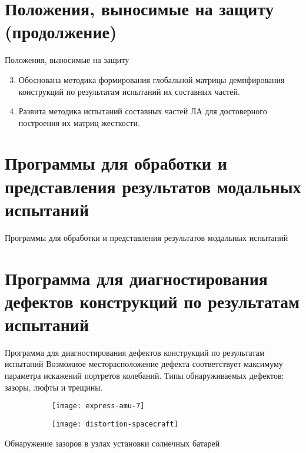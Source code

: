 \section{Положения, выносимые на защиту (продолжение)}

\begin{frame}{Положения, выносимые на защиту}
	\begin{enumerate}
		\setcounter{enumi}{2} 
		\item Обоснована методика формирования глобальной матрицы демпфирования конструкций по результатам испытаний их составных частей.
		\item Развита методика испытаний составных частей ЛА для достоверного построения их матриц жесткости.
	\end{enumerate}
\end{frame}

\section{Программы для обработки и представления результатов модальных испытаний}

\begin{frame}{Программы для обработки и представления результатов модальных испытаний}
	\begin{center}
	\end{center}
\end{frame}

\section{Программа для диагностирования дефектов конструкций по результатам испытаний}

\begin{frame}{Программа для диагностирования дефектов конструкций по результатам испытаний}
	Возможное месторасположение дефекта соответствует максимуму параметра искажений портретов колебаний. Типы обнаруживаемых дефектов: зазоры, люфты и трещины. 
	\begin{center}
		\begin{figure}
			\begin{subfigure}[t]{0.53\textwidth}
				\texttt{[image: express-amu-7]}
			\end{subfigure}
			\begin{subfigure}[t]{0.45\textwidth}
				\texttt{[image: distortion-spacecraft]}
			\end{subfigure}
		\end{figure}
		Обнаружение зазоров в узлах установки солнечных батарей
	\end{center}
\end{frame}

